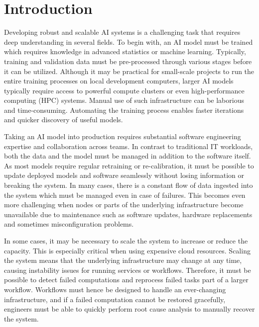 \documentclass{article}
\begin{document}

\section{Introduction}
Developing robust and scalable AI systems is a challenging task that requires deep understanding in several fields. To begin with, an AI model must be trained which requires knowledge in advanced statistics or machine learning. Typically, training and validation data must be pre-processed through various stages before it can be utilized. Although it may be practical for small-scale projects to run the entire training processes on local development computers, larger AI models typically require access to powerful compute clusters or even high-performance computing (HPC) systems. Manual use of such infrastructure can be laborious and time-consuming. Automating the training process enables faster iterations and quicker discovery of useful models.

Taking an AI model into production requires substantial software engineering expertise and collaboration across teams. In contrast to traditional IT workloads, both the data and the model must be managed in addition to the software itself. As most models require regular retraining or re-calibration, it must be possible to update deployed models and software seamlessly without losing information or breaking the system. In many cases, there is a constant flow of data ingested into the system which must be managed even in case of failures. This becomes even more challenging when nodes or parts of the underlying infrastructure become unavailable due to maintenance such as software updates, hardware replacements and sometimes misconfiguration problems.

In some cases, it may be necessary to scale the system to increase or reduce the capacity. This is especially critical when using expensive cloud resources. Scaling the system means that the underlying infrastructure may change at any time, causing instability issues for running services or workflows. Therefore, it must be possible to detect failed computations and reprocess failed tasks part of a larger workflow. Workflows must hence be designed to handle an ever-changing infrastructure, and if a failed computation cannot be restored gracefully, engineers must be able to quickly perform root cause analysis to manually recover the system.
\end{document}
